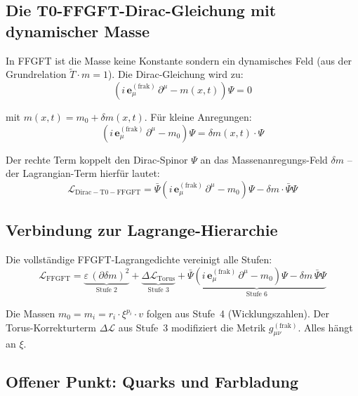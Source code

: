 \subsection{Die T0-FFGFT-Dirac-Gleichung mit dynamischer Masse}

In FFGFT ist die Masse keine Konstante sondern ein dynamisches Feld
(aus der Grundrelation $\tilde{T}\cdot m = 1$). Die Dirac-Gleichung
wird zu:
\begin{equation}
    \left(i\,\mathbf{e}_\mu^{(\mathrm{frak})}\,\partial^\mu
    - m(x,t)\right)\Psi = 0
\end{equation}

mit $m(x,t) = m_0 + \delta m(x,t)$. Für kleine Anregungen:
\begin{equation}
    \left(i\,\mathbf{e}_\mu^{(\mathrm{frak})}\,\partial^\mu - m_0\right)\Psi
    = \delta m(x,t)\cdot\Psi
\end{equation}

Der rechte Term koppelt den Dirac-Spinor $\Psi$ an das
Massenanregungs-Feld $\delta m$ -- der Lagrangian-Term hierfür
lautet:
\begin{equation}
    \mathcal{L}_{\mathrm{Dirac-T0-FFGFT}}
    = \bar{\Psi}\left(i\,\mathbf{e}_\mu^{(\mathrm{frak})}\,\partial^\mu
    - m_0\right)\Psi - \delta m \cdot \bar{\Psi}\Psi
\end{equation}

\subsection{Verbindung zur Lagrange-Hierarchie}

Die vollständige FFGFT-Lagrangedichte vereinigt alle Stufen:
\begin{equation}
    \boxed{
    \mathcal{L}_{\mathrm{FFGFT}} = \underbrace{\varepsilon\,(\partial\delta m)^2}_{\text{Stufe 2}}
    + \underbrace{\Delta\mathcal{L}_{\mathrm{Torus}}}_{\text{Stufe 3}}
    + \underbrace{\bar{\Psi}(i\,\mathbf{e}_\mu^{(\mathrm{frak})}\,\partial^\mu
    - m_0)\Psi - \delta m\,\bar{\Psi}\Psi}_{\text{Stufe 6}}
    }
\end{equation}

Die Massen $m_0 = m_i = r_i \cdot \xi^{p_i} \cdot v$ folgen aus
Stufe~4 (Wicklungszahlen). Der Torus-Korrekturterm $\Delta\mathcal{L}$
aus Stufe~3 modifiziert die Metrik $g_{\mu\nu}^{(\mathrm{frak})}$.
Alles hängt an $\xi$.

\subsection{Offener Punkt: Quarks und Farbladung}

